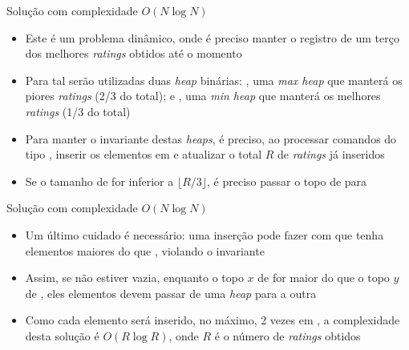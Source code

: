 \begin{frame}[fragile]{Solução com complexidade $O(N\log N)$}

    \begin{itemize}
        \item Este é um problema dinâmico, onde é preciso manter o registro de um terço
            dos melhores \textit{ratings} obtidos até o momento

        \item Para tal serão utilizadas duas \textit{heap} binárias: , uma 
            \textit{max heap} que manterá os piores \textit{ratings} (2/3 do total); e 
            , uma \textit{min heap} que manterá os melhores \textit{ratings}
            (1/3 do total)

        \item Para manter o invariante destas \textit{heaps}, é preciso, ao processar comandos
            do tipo , inserir os elementos em  e atualizar o total 
            $R$ de \textit{ratings} já inseridos

        \item Se o tamanho de  for inferior a $\lfloor R/3\rfloor$, é preciso
            passar o topo de  para 
   \end{itemize}

\end{frame}


\begin{frame}[fragile]{Solução com complexidade $O(N\log N)$}

    \begin{itemize}
        \item Um último cuidado é necessário: uma inserção pode fazer com que
             tenha elementos maiores do que , violando
            o invariante

        \item Assim, se  não estiver vazia, enquanto o topo $x$ de  
            for maior do que o topo $y$ de
            , eles elementos devem passar de uma \textit{heap} para a outra

        \item Como cada elemento será inserido, no máximo, 2 vezes em , a complexidade
            desta solução é $O(R\log R)$, onde $R$ é o número de \textit{ratings} obtidos
    \end{itemize}

\end{frame}

